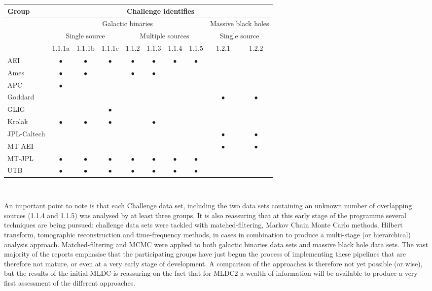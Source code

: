 \documentclass[11pt]{article}
\begin{document}
\begin{center}
\begin{tabular}{l|ccccccccc}
\hline \hline
Group              &    \multicolumn{9}{c}{Challenge identifies} \\
\hline
                   &    \multicolumn{7}{c}{Galactic binaries} & \multicolumn{2}{c}{Massive black holes} \\
                   &    \multicolumn{3}{c}{Single source} & \multicolumn{4}{c}{Multiple sources} & \multicolumn{2}{c}{Single source} \\
                   &    1.1.1a & 1.1.1b  & 1.1.1c & 1.1.2 & 1.1.3 & 1.1.4 & 1.1.5 & 1.2.1 & 1.2.2 \\

AEI             & $\bullet$  &  $\bullet$  &  $\bullet$  &  $\bullet$  &  $\bullet$  &  $\bullet$  &  $\bullet$  &  & \\
Ames              & $\bullet$  &  $\bullet$  &             &  $\bullet$  &  $\bullet$  &   &   &  & \\ 
APC              & $\bullet$  & & & & & &  \\
Goddard           & & & & & & & & $\bullet$  &  $\bullet$ \\ 
GLIG               & & & $\bullet$  & & & & & & \\
Krolak            & $\bullet$  &  $\bullet$  &  $\bullet$  &  &  $\bullet$  &    &   &  & \\ 
JPL-Caltech       & & & & & & & & $\bullet$  &  $\bullet$ \\
MT-AEI            & & & & & & & & $\bullet$  &  $\bullet$ \\ 
MT-JPL             &  $\bullet$  &    $\bullet$  &    $\bullet$  &    $\bullet$  &    $\bullet$  &    $\bullet$  &  $\bullet$  &  \\
UTB               & $\bullet$  &  $\bullet$  &  $\bullet$  &  $\bullet$  &  $\bullet$  &  $\bullet$  &  $\bullet$  &  & \\
\hline
\end{tabular} \\
\end{center}

An important point to note is that each Challenge data set, including the two data sets containing an unknown number of overlapping sources (1.1.4 and 1.1.5) was analysed by at least three groups. It is also reassuring that at this early stage of the programme several techniques are being pursued: challenge data sets were tackled with matched-filtering, Markov Chain Monte Carlo methods, Hilbert transform, tomographic reconstruction and time-frequency methods, in cases in combination to produce a multi-stage (or hierarchical) analysis approach. Matched-filtering and MCMC were applied to both galactic binaries data sets and massive black hole data sets. The vast majority of the reports emphasise that the participating groups have just begun the process of implementing these pipelines that are therefore not mature, or even at a very early stage of development. A comparison of the approaches is therefore not yet possible (or wise), but the results of the initial MLDC is reassuring on the fact that for MLDC2 a wealth of information will be available to produce a very first assessment of the different approaches.
\end{document}
